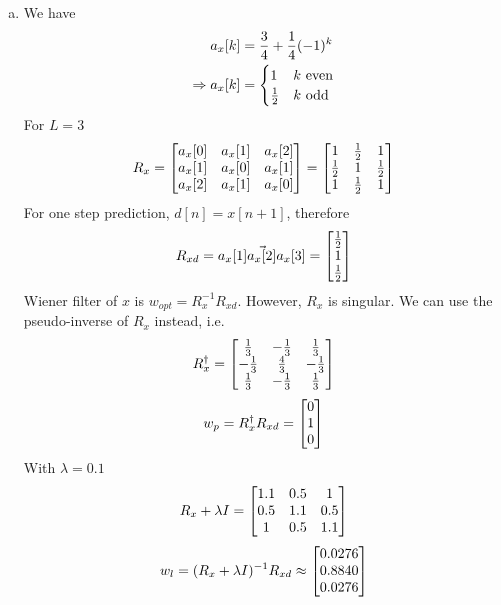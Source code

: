 \begin{enumerate}[(a)]
\item We have
\begin{align*}
	a_x[k] &= \frac{3}{4} + \frac{1}{4}(-1)^k \\
	\Rightarrow a_x[k] &= \begin{cases}1 & k \text{ even} \\ \frac{1}{2} & k \text{ odd}\end{cases}
\end{align*}
For $L=3$
\[R_x = \begin{bmatrix} a_x[0] & a_x[1] & a_x[2] \\ a_x[1] & a_x[0] & a_x[1] \\ a_x[2] & a_x[1] & a_x[0] \end{bmatrix} = \begin{bmatrix} 1 & \frac{1}{2} & 1 \\ \frac{1}{2} & 1 & \frac{1}{2} \\ 1 & \frac{1}{2} & 1 \end{bmatrix}\]
For one step prediction, $d[n] = x[n+1]$, therefore
\[R_{xd} = \vec{a_x[1] \\ a_x[2] \\ a_x[3]} = \begin{bmatrix} \frac{1}{2} \\ 1 \\ \frac{1}{2} \end{bmatrix}\]
Wiener filter of $x$ is $w_{opt} = R_x^{-1} R_{xd}$. However, $R_x$ is singular. We can use the pseudo-inverse of $R_x$ instead, i.e. 
\[R_x^\dagger = \begin{bmatrix} \frac{1}{3} & -\frac{1}{3} & \frac{1}{3} \\ -\frac{1}{3} & \frac{4}{3} & -\frac{1}{3} \\ \frac{1}{3} & -\frac{1}{3} & \frac{1}{3} \end{bmatrix}\]
\[w_p = R_x^\dagger R_{xd} = \begin{bmatrix} 0 \\ 1 \\ 0 \end{bmatrix}\]
With $\lambda = 0.1$
\[R_x + \lambda I = \begin{bmatrix} 1.1 & 0.5 & 1 \\ 0.5 & 1.1 & 0.5 \\ 1 & 0.5 & 1.1 \end{bmatrix}\]
\[w_l = (R_x + \lambda I)^{-1} R_{xd} \approx \begin{bmatrix} 0.0276 \\ 0.8840 \\ 0.0276 \end{bmatrix}\]
\end{enumerate}